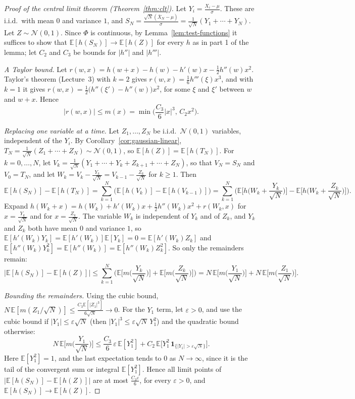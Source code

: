 \documentclass[11pt]{article}
\newcommand{\E}{\mathbb{E}}
\theoremstyle{definition}
\theoremstyle{plain}
\theoremstyle{remark}
\begin{document}
\begin{proof}[Proof of the central limit theorem (Theorem~\ref{thm:clt})]
    Let $Y_i = \frac{X_i - \mu}{\sigma}$. These are i.i.d.\ with mean $0$ and variance $1$, and $S_N = \frac{\sqrt{N}(\bar X_N - \mu)}{\sigma} = \frac{1}{\sqrt{N}}(Y_1 + \cdots + Y_N)$. Let $Z \sim \mathcal{N}(0, 1)$. Since $\Phi$ is continuous, by Lemma~\ref{lem:test-functions} it suffices to show that $\E[h(S_N)] \to \E[h(Z)]$ for every $h$ as in part 1 of the lemma; let $C_2$ and $C_3$ be bounds for $|h''|$ and $|h'''|$.

    \emph{A Taylor bound.} Let $r(w, x) = h(w + x) - h(w) - h'(w)x - \frac{1}{2}h''(w)x^2$. Taylor's theorem (Lecture~3) with $k = 2$ gives $r(w, x) = \frac{1}{6}h'''(\xi)x^3$, and with $k = 1$ it gives $r(w, x) = \frac{1}{2}\big(h''(\xi') - h''(w)\big)x^2$, for some $\xi$ and $\xi'$ between $w$ and $w + x$. Hence
    \[|r(w, x)| \leq m(x) = \min\Big(\frac{C_3}{6}|x|^3, \, C_2x^2\Big).\]

    \emph{Replacing one variable at a time.} Let $Z_1, \ldots, Z_N$ be i.i.d.\ $\mathcal{N}(0, 1)$ variables, independent of the $Y_i$. By Corollary~\ref{cor:gaussian-linear}, $T_N = \frac{1}{\sqrt{N}}(Z_1 + \cdots + Z_N) \sim \mathcal{N}(0, 1)$, so $\E[h(Z)] = \E[h(T_N)]$. For $k = 0, \ldots, N$, let $V_k = \frac{1}{\sqrt{N}}(Y_1 + \cdots + Y_k + Z_{k+1} + \cdots + Z_N)$, so that $V_N = S_N$ and $V_0 = T_N$, and let $W_k = V_k - \frac{Y_k}{\sqrt{N}} = V_{k-1} - \frac{Z_k}{\sqrt{N}}$ for $k \geq 1$. Then
    \[\E[h(S_N)] - \E[h(T_N)] = \sum_{k=1}^N \big(\E[h(V_k)] - \E[h(V_{k-1})]\big) = \sum_{k=1}^N \Big(\E\Big[h\Big(W_k + \frac{Y_k}{\sqrt{N}}\Big)\Big] - \E\Big[h\Big(W_k + \frac{Z_k}{\sqrt{N}}\Big)\Big]\Big).\]
    Expand $h(W_k + x) = h(W_k) + h'(W_k)x + \frac{1}{2}h''(W_k)x^2 + r(W_k, x)$ for $x = \frac{Y_k}{\sqrt{N}}$ and for $x = \frac{Z_k}{\sqrt{N}}$. The variable $W_k$ is independent of $Y_k$ and of $Z_k$, and $Y_k$ and $Z_k$ both have mean $0$ and variance $1$, so $\E[h'(W_k)Y_k] = \E[h'(W_k)]\E[Y_k] = 0 = \E[h'(W_k)Z_k]$ and $\E[h''(W_k)Y_k^2] = \E[h''(W_k)] = \E[h''(W_k)Z_k^2]$. So only the remainders remain:
    \[\big|\E[h(S_N)] - \E[h(Z)]\big| \leq \sum_{k=1}^N \Big(\E\Big[m\Big(\frac{Y_k}{\sqrt{N}}\Big)\Big] + \E\Big[m\Big(\frac{Z_k}{\sqrt{N}}\Big)\Big]\Big) = N\,\E\Big[m\Big(\frac{Y_1}{\sqrt{N}}\Big)\Big] + N\,\E\Big[m\Big(\frac{Z_1}{\sqrt{N}}\Big)\Big].\]

    \emph{Bounding the remainders.} Using the cubic bound, $N\,\E[m(Z_1/\sqrt{N})] \leq \frac{C_3\E[|Z_1|^3]}{6\sqrt{N}} \to 0$. For the $Y_1$ term, let $\varepsilon > 0$, and use the cubic bound if $|Y_1| \leq \varepsilon\sqrt{N}$ (then $|Y_1|^3 \leq \varepsilon\sqrt{N}\,Y_1^2$) and the quadratic bound otherwise:
    \[N\,\E\Big[m\Big(\frac{Y_1}{\sqrt{N}}\Big)\Big] \leq \frac{C_3}{6}\,\varepsilon\,\E[Y_1^2] + C_2\,\E\big[Y_1^2\,\mathbf{1}_{\{|Y_1| > \varepsilon\sqrt{N}\}}\big].\]
    Here $\E[Y_1^2] = 1$, and the last expectation tends to $0$ as $N \to \infty$, since it is the tail of the convergent sum or integral $\E[Y_1^2]$. Hence all limit points of $\big|\E[h(S_N)] - \E[h(Z)]\big|$ are at most $\frac{C_3\varepsilon}{6}$, for every $\varepsilon > 0$, and $\E[h(S_N)] \to \E[h(Z)]$.
\end{proof}
\end{document}
